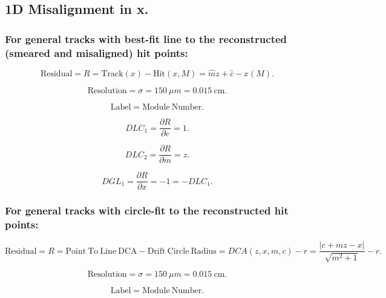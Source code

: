 \documentclass[a4paper,11pt]{article}
\begin{document}
\subsection{1D Misalignment in x.}

\subsubsection{For general tracks with best-fit line to the reconstructed (smeared and misaligned) hit points:}
\begin{equation}
\mathrm{Residual} = R = \mathrm{Track}(x) - \mathrm{Hit}(x,M) = \hat{m}z+\hat{c} - x(M).
\end{equation}

\begin{equation}	
\mathrm{Resolution} = \sigma = 150 \ \mu m = 0.015 \ \mathrm{cm}.
\end{equation}

\begin{equation}	
\mathrm{Label}= \mathrm{Module \ Number}.
\end{equation}

\begin{equation}
DLC_1 = \frac{ \partial R}{\partial c} = 1.
\end{equation}

\begin{equation}
DLC_2 = \frac{ \partial R}{\partial m} = z.
\end{equation}

\begin{equation}
DGL_1 = \frac{ \partial R}{\partial x} = -1 = - DLC_1.
\end{equation}

\subsubsection{For general tracks with circle-fit to the reconstructed hit points:}

\begin{equation}	
\mathrm{Residual}= R =\mathrm{Point \ To \ Line \ DCA} - \mathrm{Drift \ Circle \ Radius} = DCA(z,x,m,c) - r = \frac{ |c+mz-x| }  { \sqrt{m^2+1} } -r.
\end{equation}

\begin{equation}	
\mathrm{Resolution} = \sigma = 150 \ \mu m = 0.015 \ \mathrm{cm}.
\end{equation}

\begin{equation}	
\mathrm{Label}= \mathrm{Module \ Number}.
\end{equation}
\end{document}
